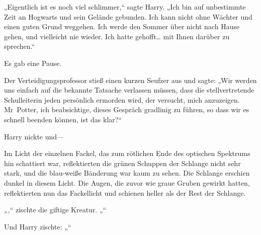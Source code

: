 „Eigentlich ist es noch viel schlimmer,“ sagte Harry. „Ich bin auf unbestimmte Zeit an Hogwarts und sein Gelände gebunden. Ich kann nicht ohne Wächter und einen guten Grund weggehen. Ich werde den Sommer über nicht nach Hause gehen, und vielleicht nie wieder. Ich hatte gehofft… mit Ihnen darüber zu sprechen.“

Es gab eine Pause.

Der Verteidigungsprofessor stieß einen kurzen Seufzer aus und sagte: „Wir werden uns einfach auf die bekannte Tatsache verlassen müssen, dass die stellvertretende Schulleiterin jeden persönlich ermorden wird, der versucht, mich anzuzeigen. Mr~Potter, ich beabsichtige, dieses Gespräch gradlinig zu führen, so dass wir es schnell beenden können, ist das klar?“

Harry nickte und—

Im Licht der einzelnen Fackel, das zum rötlichen Ende des optischen Spektrums hin schattiert war, reflektierten die grünen Schuppen der Schlange nicht sehr stark, und die blau-weiße Bänderung war kaum zu sehen. Die Schlange erschien dunkel in diesem Licht. Die Augen, die zuvor wie graue Gruben gewirkt hatten, reflektierten nun das Fackellicht und schienen heller als der Rest der Schlange.

„,“ zischte die giftige Kreatur. „“

Und Harry zischte: „“

